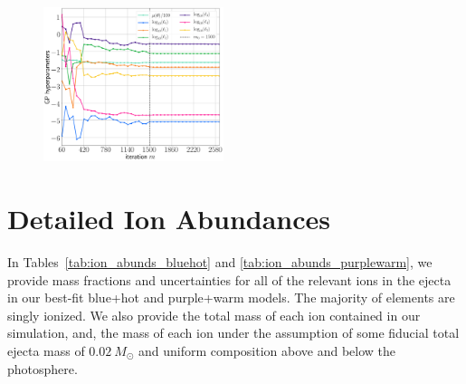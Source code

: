 \documentclass[twocolumn, twocolappendix]{aastex63}
\begin{document}
\begin{figure}[!ht]
    \centering
    \includegraphics[width=0.47\textwidth]{figs/appendix/220808_014638_GP_hparams.png}
    \label{fig:hparams}
\end{figure}


\section{Detailed Ion Abundances}\label{app:ion_abunds}

In Tables~\ref{tab:ion_abunds_bluehot} and \ref{tab:ion_abunds_purplewarm}, we provide mass fractions and uncertainties for all of the relevant ions in the ejecta in our best-fit blue+hot and purple+warm models. The majority of elements are singly ionized. We also provide the total mass of each ion contained in our simulation, and, the mass of each ion under the assumption of some fiducial total ejecta mass of $0.02~M_{\odot}$ and uniform composition above and below the photosphere.
\end{document}
